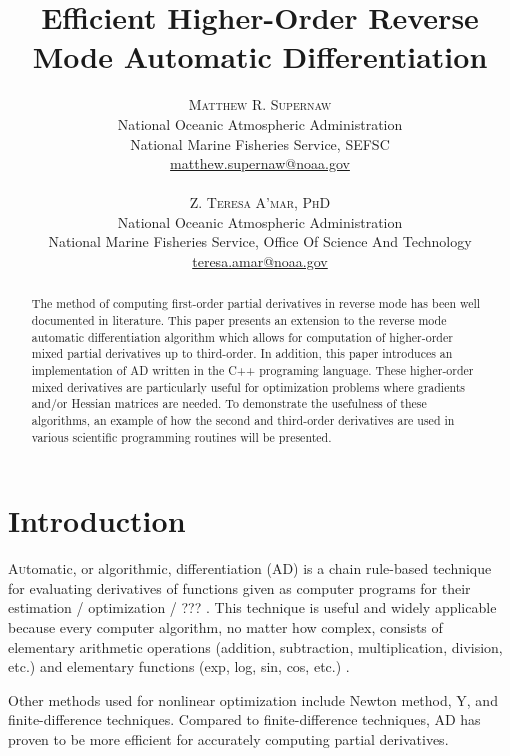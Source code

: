 \documentclass[oneside]{article}
\title{\vspace{-15mm}\fontsize{24pt}{10pt}\selectfont\textbf{Efficient Higher-Order Reverse Mode Automatic Differentiation}} %
\author{
\large
\textsc{Matthew R. Supernaw}\\[2mm] %
\normalsize National Oceanic Atmospheric Administration \\ %
\normalsize National Marine Fisheries Service, SEFSC\\ %
\normalsize \href{mailto:matthew.supernaw@noaa.gov}{matthew.supernaw@noaa.gov} \\ %
\\
\textsc{Z. Teresa A'mar, PhD}\\[2mm] %
\normalsize National Oceanic Atmospheric Administration \\ %
\normalsize National Marine Fisheries Service, Office Of Science And Technology\\ %
\normalsize \href{mailto:teresa.amar@noaa.gov}{teresa.amar@noaa.gov} \\%
\vspace{-5mm}
}
\date{}
\begin{document}
\maketitle %

\thispagestyle{fancy} %


\begin{abstract}

\noindent
The method of computing first-order partial derivatives in reverse mode has been well documented in literature. This paper presents an extension to the reverse mode automatic differentiation algorithm which allows for computation of higher-order mixed partial derivatives up to third-order. In addition, this paper introduces an implementation of AD written in the C++ programing language. These higher-order mixed derivatives are particularly useful for optimization problems where gradients and/or Hessian matrices are needed. To demonstrate the usefulness of these algorithms, an example of how the second and third-order derivatives are used in various scientific programming routines will be presented.

\end{abstract}



\section{Introduction}

\lettrine[nindent=0em,lines=3]{A}utomatic, or algorithmic, differentiation (AD) is a chain rule-based technique for evaluating derivatives of functions given as computer programs for their estimation / optimization / ??? \cite{griewank}. This technique is useful and widely applicable because every computer algorithm, no matter how complex, consists of elementary arithmetic operations (addition, subtraction, multiplication, division, etc.) and elementary functions (exp, log, sin, cos, etc.) \cite{wiki_ad}.

Other methods used for nonlinear optimization include Newton method, Y, and finite-difference techniques.  Compared to finite-difference techniques, AD has proven to be more efficient for accurately computing partial derivatives. \\
\end{document}
